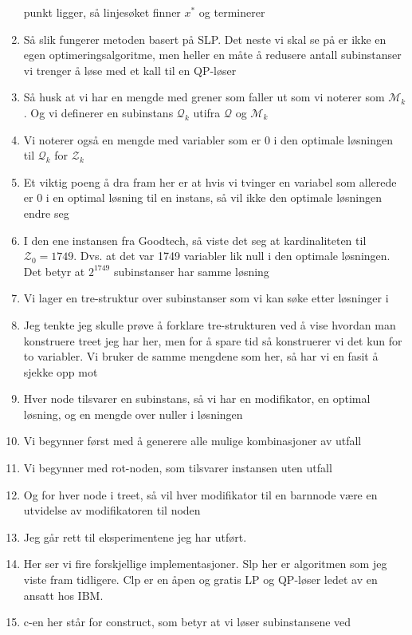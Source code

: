 \documentclass[a4paper,twocolumn]{report}
\begin{document}
\begin{enumerate}
      punkt ligger, så linjesøket finner $x^*$ og terminerer
\item Så slik fungerer metoden basert på SLP. Det neste vi skal se på er ikke
      en egen optimeringsalgoritme, men heller en måte å redusere antall
      subinstanser vi trenger å løse med et kall til en QP-løser
\item Så husk at vi har en mengde med grener som faller ut som vi noterer som
      $\mathcal{M}_k$. Og vi definerer en subinstans $\mathcal{Q}_k$ utifra
      $\mathcal{Q}$ og $\mathcal{M}_k$
\item Vi noterer også en mengde med variabler som er $0$ i den optimale
      løsningen til $\mathcal{Q}_k$ for $\mathcal{Z}_k$
\item Et viktig poeng å dra fram her er at hvis vi tvinger en variabel som
      allerede er $0$ i en optimal løsning til en instans, så vil ikke den
      optimale løsningen endre seg
\item I den ene instansen fra Goodtech, så viste det seg at kardinaliteten
      til $\mathcal{Z}_0 = 1749$. Dvs. at det var 1749 variabler lik null i den
      optimale løsningen. Det betyr at $2^{1749}$ subinstanser har samme
      løsning
\item Vi lager en tre-struktur over subinstanser som vi kan søke etter
      løsninger i
\item Jeg tenkte jeg skulle prøve å forklare tre-strukturen ved å vise hvordan
      man konstruere treet jeg har her, men for å spare tid så konstruerer
      vi det kun for to variabler. Vi bruker de samme mengdene som her, så
      har vi en fasit å sjekke opp mot
\item Hver node tilsvarer en subinstans, så vi har en modifikator, en optimal
      løsning, og en mengde over nuller i løsningen
\item Vi begynner først med å generere alle mulige kombinasjoner av utfall
\item Vi begynner med rot-noden, som tilsvarer instansen uten utfall
\item Og for hver node i treet, så vil hver modifikator til en barnnode være en
      utvidelse av modifikatoren til noden
\item Jeg går rett til eksperimentene jeg har utført.
\item Her ser vi fire forskjellige implementasjoner. Slp her er algoritmen
      som jeg viste fram tidligere. Clp er en åpen og gratis LP og QP-løser
      ledet av en ansatt hos IBM.
\item c-en her står for construct, som betyr at vi løser subinstansene ved

\end{enumerate}
\end{document}
